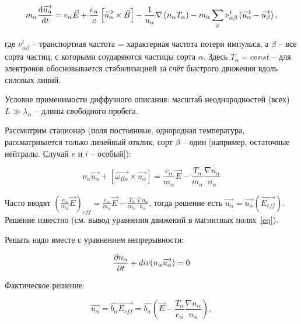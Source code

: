 \documentclass[10pt, a4paper]{article}
\begin{document}
\begin{equation*}
	m_\alpha\dv{\overrightarrow{u_\alpha}}{t}=e_\alpha\vec{E}+\frac{e_\alpha}{c}\left[\overrightarrow{u_\alpha}\times\vec{B}\right]-\frac{1}{n_\alpha}\nabla\left(n_\alpha T_\alpha\right)- m_\alpha\sum\limits_{\beta}\nu_{\alpha\beta}^t\left(\overrightarrow{u_\alpha}-\overrightarrow{u_\beta}\right),
\end{equation*}

где $\nu_{\alpha\beta}^t$ -- транспортная частота = характерная частота потери импульса, а $\beta$ -- все сорта частиц, с которыми соударяются частицы сорта $\alpha$. Здесь $T_\alpha=const$ -- для электронов обосновывается стабилизацией за счёт быстрого движения вдоль силовых линий.

Условие применимости диффузного описания: масштаб неоднородностей (всех) $L \gg \lambda_\alpha$ -- длины свободного пробега.

Рассмотрим стационар (поля постоянные, однородная температура, рассматривается только линейный отклик, сорт $\beta$ -- один [например, остаточные нейтралы. Случай $e$ и $i$ -- особый]):

\begin{equation*}
	\nu_\alpha \overrightarrow{u_\alpha} + \left[\overrightarrow{\omega_{B\alpha}}\times \overrightarrow{u_\alpha}\right] = \frac{e_\alpha}{m_\alpha}\vec{E}-\frac{T_\alpha}{m_\alpha}\frac{\nabla n_\alpha}{n_\alpha}
\end{equation*}

Часто вводят $\left(\frac{e_\alpha}{m_\alpha}\vec{E}\right)_{eff} = \frac{e_\alpha}{m_\alpha}\vec{E}-\frac{T_\alpha}{m_\alpha}\frac{\nabla n_\alpha}{n_\alpha}$, тогда решение есть $\overrightarrow{u_\alpha} = \overrightarrow{u_\alpha} (\overrightarrow{E_{eff}})$. Решение известно (см. вывод уравнения движений в магнитных полях~\eqref{eq}).

Решать надо вместе с уравнением непрерывности:

\begin{equation*}
	\pdv{n_\alpha}{t} + div(n_\alpha\overrightarrow{u_\alpha}) = 0
\end{equation*}

Фактическое решение:

\begin{equation*}
	\overrightarrow{u_\alpha} = \widehat{b_\alpha} \overrightarrow{E_{eff}} = \widehat{b_\alpha} \left(\vec{E}-\frac{T_\alpha}{e_\alpha}\frac{\nabla n_\alpha}{n_\alpha}\right),
\end{equation*}
\end{document}
